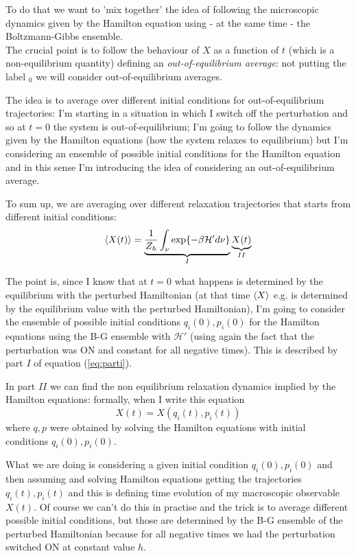 \documentclass[\main/main.tex]{subfiles}
\begin{document}
To do that we want to 'mix together' the idea of following the microscopic dynamics given by the Hamilton equation using - at the same time - the Boltzmann-Gibbs ensemble. \\

The crucial point is to follow the behaviour of $X$ as a function of $t$ (which is a non-equilibrium quantity) defining an \textit{out-of-equilibrium average}: not putting the label $_0$ we will consider out-of-equilibrium averages.

The idea is to average over different initial conditions for out-of-equilibrium trajectories: I'm starting in a situation in which I switch off the perturbation and so at $t=0$ the system is out-of-equilibrium; I'm going to follow the dynamics given by the Hamilton equations (how the system relaxes to equilibrium) but I'm considering an ensemble of possible initial conditions for the Hamilton equation and in this sense I'm introducing the idea of considering an out-of-equilibrium average.

To sum up, we are averaging over different relaxation trajectories that starts from different initial conditions:
\begin{equation}
    \left\langle X(t) \right\rangle=\underbrace{\frac{1}{Z_h}\int_{\nu}\exp{-\beta\mathcal{H'}d\nu}}_{I}\underbrace{X(t)}_{II}
    \label{eq:parti}
\end{equation}

The point is, since I know that at $t=0$ what happens is determined by the equilibrium with the perturbed Hamiltonian (at that time $\left\langle X \right\rangle$ e.g. is determined by the equilibrium value with the perturbed Hamiltonian), I'm going to consider the ensemble of possible initial conditions $q_i(0), p_i(0)$ for the Hamilton equations using the B-G ensemble with $\mathcal{H'}$ (using again the fact that the perturbation was ON and constant for all negative times). This is described by part $I$ of equation (\ref{eq:parti}).

In part $II$ we can find the non equilibrium relaxation dynamics implied by the Hamilton equations: formally, when I write this equation
\begin{equation}
    X(t)=X(q_i(t),p_i(t))
\end{equation}
where $q,p$ were obtained by solving the Hamilton equations with initial conditions $q_i(0),p_i(0)$.

What we are doing is considering a given initial condition $q_i(0),p_i(0)$ and then assuming and solving Hamilton equations getting the trajectories $q_i(t),p_i(t)$ and this is defining time evolution of my macroscopic observable $X(t)$. Of course we can't do this in practise and the trick is to average different possible initial conditions, but those are determined by the B-G ensemble of the perturbed Hamiltonian because for all negative times we had the perturbation switched ON at constant value $h$. \\
\end{document}
